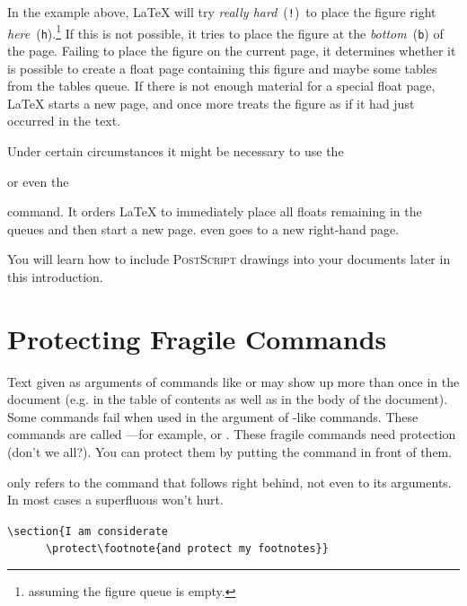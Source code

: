 \noindent In the example above, 
\LaTeX{} will try \emph{really hard}~(\texttt{!})\ to place the figure
right \emph{here}~(\texttt{h}).\footnote{assuming the figure queue is
  empty.} If this is not possible, it tries to place the figure at the
\emph{bottom}~(\texttt{b}) of the page.  Failing to place the figure
on the current page, it determines whether it is possible to create a float
page containing this figure and maybe some tables from the tables
queue. If there is not enough material for a special float page,
\LaTeX{} starts a new page, and once more treats the figure as if it
had just occurred in the text.

Under certain circumstances it might be necessary to use the 

\begin{lscommand}
 or even the  
\end{lscommand}

\noindent command. It orders \LaTeX{} to immediately place all 
floats remaining in the queues and then start a new
page.  even goes to a new right-hand page.

You will learn how to include \textsc{PostScript}
drawings into your \LaTeXe{} documents later in this introduction.

\section{Protecting Fragile Commands}

Text given as arguments of commands like  or  may
show up more than once in the document (e.g. in the table of contents as
well as in the body of the document). Some commands fail when used in the
argument of -like commands. These commands are called 
---for example,  or . These
fragile commands need protection (don't we all?). You can
protect them by putting the  command in front of them.

 only refers to the command that follows right behind, not even
to its arguments. In most cases a superfluous  won't hurt.

\begin{code}
\verb|\section{I am considerate|\\
\verb|      \protect\footnote{and protect my footnotes}}|
\end{code}

